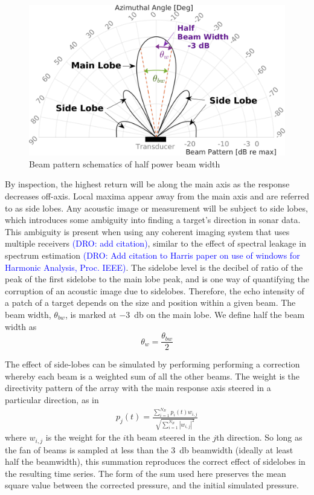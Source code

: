 \documentclass[utf8]{frontiersSCNS} %
\begin{document}
\begin{figure}[hbt!]
  \centering
  \includegraphics[width=\columnwidth]{images/beam_pattern_plot_w_annotations_mod_crop.png}
  \caption{Beam pattern schematics of half power beam width}
  \label{f:bpattern}
\end{figure}

By inspection, the highest return will be along the main axis as the response decreases off-axis. Local maxima appear away from the main axis and are referred to as side lobes. Any acoustic image or measurement will be subject to side lobes, which introduces some ambiguity into finding a target's direction in sonar data. This ambiguity is present when using any coherent imaging system that uses multiple receivers \textcolor{blue}{(DRO: add citation)}, similar to the effect of spectral leakage in spectrum estimation \textcolor{blue}{(DRO: Add citation to Harris paper on use of windows for Harmonic Analysis, Proc. IEEE)}. The sidelobe level is the decibel of ratio of the peak of the first sidelobe to the main lobe peak, and is one way of quantifying the corruption of an acoustic image due to sidelobes. Therefore, the echo intensity of a patch of a target depends on the size and position within a given beam. The beam width, $\theta_{bw}$, is marked at \SI{-3}{\decibel} on the main lobe. We define half the beam width as 
\begin{equation}
    \theta_w = \frac{\theta_{bw}}{2}
\end{equation}

The effect of side-lobes can be simulated by performing performing a correction whereby each beam is a weighted sum of all the other beams. The weight is the directivity pattern of the array with the main response axis steered in a particular direction, as in
\begin{align}
    p_{j}(t) = \frac{\sum\limits_{i=1}^{N_B}p_i(t) w_{i,j}}{\sqrt{\sum\limits_{i=1}^{N_B}|w_{i,j}|^2}}
    \label{e:beampatterneffect}
\end{align}
where $w_{i,j}$ is the weight for the $i$th beam steered in the $j$th direction. So long as the fan of beams is sampled at less than the \SI{3}{\decibel} beamwidth (ideally at least half the beamwidth), this summation reproduces the correct effect of sidelobes in the resulting time series. The form of the sum used here preserves the mean square value between the corrected pressure, and the initial simulated pressure.
\end{document}
